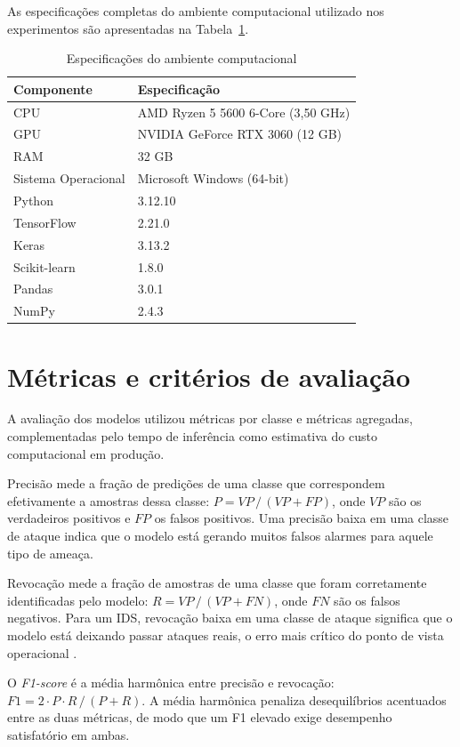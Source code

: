 As especificações completas do ambiente computacional utilizado nos experimentos são apresentadas na Tabela~\ref{tab:ambiente}.

\begin{table}[H]
\centering
\caption{Especificações do ambiente computacional}
\label{tab:ambiente}
\begin{tabular}{ll}
\hline
Componente & Especificação \\
\hline
CPU             & AMD Ryzen 5 5600 6-Core (3,50 GHz) \\
GPU             & NVIDIA GeForce RTX 3060 (12 GB) \\
RAM             & 32 GB \\
Sistema Operacional & Microsoft Windows (64-bit) \\
Python          & 3.12.10 \\
TensorFlow      & 2.21.0 \\
Keras           & 3.13.2 \\
Scikit-learn    & 1.8.0 \\
Pandas          & 3.0.1 \\
NumPy           & 2.4.3 \\
\hline
\end{tabular}
\end{table}

\section{Métricas e critérios de avaliação}

A avaliação dos modelos utilizou métricas por classe e métricas agregadas, complementadas pelo tempo de inferência como estimativa do custo computacional em produção.

Precisão mede a fração de predições de uma classe que correspondem efetivamente a amostras dessa classe: $P = VP\,/\,(VP + FP)$, onde $VP$ são os verdadeiros positivos e $FP$ os falsos positivos. Uma precisão baixa em uma classe de ataque indica que o modelo está gerando muitos falsos alarmes para aquele tipo de ameaça.

Revocação mede a fração de amostras de uma classe que foram corretamente identificadas pelo modelo: $R = VP\,/\,(VP + FN)$, onde $FN$ são os falsos negativos. Para um IDS, revocação baixa em uma classe de ataque significa que o modelo está deixando passar ataques reais, o erro mais crítico do ponto de vista operacional \cite{santos2023ercemapi}.

O \textit{F1-score} é a média harmônica entre precisão e revocação: $F1 = 2 \cdot P \cdot R\,/\,(P + R)$. A média harmônica penaliza desequilíbrios acentuados entre as duas métricas, de modo que um F1 elevado exige desempenho satisfatório em ambas.

